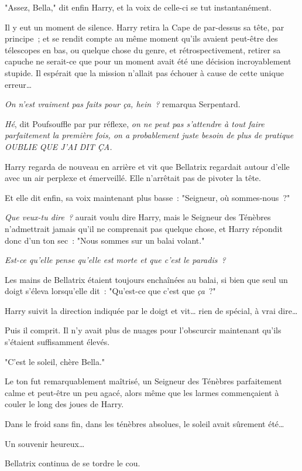 "Assez, Bella," dit enfin Harry, et la voix de celle-ci se tut instantanément.

Il y eut un moment de silence. Harry retira la Cape de par-dessus sa tête, par principe~; et se rendit compte au même moment qu'ils avaient peut-être des télescopes en bas, ou quelque chose du genre, et rétrospectivement, retirer sa capuche ne serait-ce que pour un moment avait été une décision incroyablement stupide. Il espérait que la mission n'allait pas échouer à cause de cette unique erreur…

\emph{On n'est vraiment pas faits pour ça, hein~?} remarqua Serpentard.

\emph{Hé}, dit Poufsouffle par pur réflexe, \emph{on ne peut pas s'attendre à tout faire parfaitement la première fois, on a probablement juste besoin de plus de pratique OUBLIE QUE J'AI DIT ÇA.}

Harry regarda de nouveau en arrière et vit que Bellatrix regardait autour d'elle avec un air perplexe et émerveillé. Elle n'arrêtait pas de pivoter la tête.

Et elle dit enfin, sa voix maintenant plus basse~: "Seigneur, où sommes-nous~?"

\emph{Que veux-tu dire~?} aurait voulu dire Harry, mais le Seigneur des Ténèbres n'admettrait jamais qu'il ne comprenait pas quelque chose, et Harry répondit donc d'un ton sec~: "Nous sommes sur un balai volant."

\emph{Est-ce qu'elle pense qu'elle est morte et que c'est le paradis~?}

Les mains de Bellatrix étaient toujours enchaînées au balai, si bien que seul un doigt s'éleva lorsqu'elle dit~: "Qu'est-ce que c'est que \emph{ça}~?"

Harry suivit la direction indiquée par le doigt et vit… rien de spécial, à vrai dire…

Puis il comprit. Il n'y avait plus de nuages pour l'obscurcir maintenant qu'ils s'étaient suffisamment élevés.

"C'est le soleil, chère Bella."

Le ton fut remarquablement maîtrisé, un Seigneur des Ténèbres parfaitement calme et peut-être un peu agacé, alors même que les larmes commençaient à couler le long des joues de Harry.

Dans le froid sans fin, dans les ténèbres absolues, le soleil avait sûrement été…

Un souvenir heureux…

Bellatrix continua de se tordre le cou.

